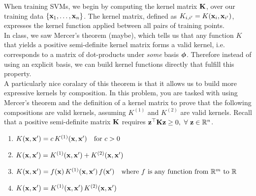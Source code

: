 \documentclass[11pt,letterpaper]{article}
\begin{document}
\begin{enumerate}
{{  \noindent When training SVMs, we begin by computing the kernel matrix $\mathbf{K}$,
  over our training data $\{\mathbf{x}_1, \ldots, \mathbf{x}_n\}$.  The kernel
  matrix, defined as $K_{i, i'} = K(\mathbf{x}_i, \mathbf{x}_{i'})$, expresses
  the kernel function applied between all pairs of training points.\\

  \noindent In class, we saw Mercer's theorem (maybe), which tells us that any function
  $K$ that yields a positive semi-definite kernel matrix forms a valid
  kernel, i.e. corresponds to a matrix of dot-products under
  \textit{some} basis $\boldsymbol{\phi}$. Therefore instead of using an explicit
  basis, we can build kernel functions directly that fulfill this
  property.\\

  \noindent A particularly nice coralary of this theorem is that it allows us to
  build more expressive kernels by composition.  In this problem, you
  are tasked with using Mercer's theorem and the definition of a
  kernel matrix to prove that the following  compositions are valid kernels, 
  assuming $K^{(1)}$ and $K^{(2)}$ are valid kernels. Recall that a positive semi-definite matrix $\mathbf{K}$ requires $\mathbf{z}^\top \mathbf{Kz} \geq 0,\ \forall\ \mathbf{z} \in \reals^n$.

  \begin{enumerate}
  \item $K(\mathbf{x}, \mathbf{x}') = c\,K^{(1)}(\mathbf{x}, \mathbf{x}') \quad \text{for $c>0$}$
  \item $   K(\mathbf{x}, \mathbf{x}')= K^{(1)}(\mathbf{x}, \mathbf{x}') + K^{(2)}(\mathbf{x}, \mathbf{x}')$
  \item   $ K(\mathbf{x}, \mathbf{x}') = f(\mathbf{x})\,K^{(1)}(\mathbf{x}, \mathbf{x}')\,f(\mathbf{x}') \quad
  \text{where $f$ is any function from~$\mathbb{R}^m$ to $\mathbb{R}$}$
  \item $ K(\mathbf{x}, \mathbf{x}') = K^{(1)}(\mathbf{x}, \mathbf{x}')\,K^{(2)}(\mathbf{x},
  \mathbf{x}')$


\end{enumerate}}}
\end{enumerate}
\end{document}
